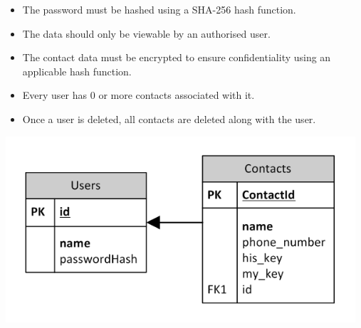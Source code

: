 \begin{itemize}
\item The password must be hashed using a SHA-256 hash function.
\item The data should only be viewable by an authorised user.
\item The contact data must be encrypted to ensure confidentiality using an applicable hash function.
\item Every user has 0 or more contacts associated with it.
\item Once a user is deleted, all contacts are deleted along with the user.
\end{itemize}
\begin{center}
 \includegraphics[width=13cm]{diagrams/LogicalDatabase.png}
\end{center}

